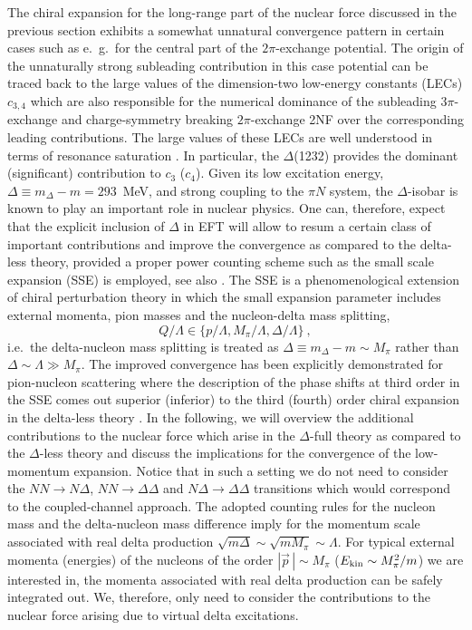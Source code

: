 \documentclass[aps,rmp,nofootinbib,twocolumn,floatfix]{revtex4}
\newcommand{\beq}{\begin{equation}}
\newcommand{\eeq}{\end{equation}}
\begin{document}
The chiral expansion for the long-range part of the nuclear force discussed in
the previous section exhibits a somewhat unnatural convergence pattern in
certain cases such as e.~g.~for the central part of the $2\pi$-exchange
potential.  The origin of the 
unnaturally strong subleading contribution in this case potential can be
traced back to the large values of the dimension-two low-energy
constants (LECs) $c_{3,4}$ which are also responsible
for the numerical dominance of the subleading $3\pi$-exchange 
\cite{Kaiser:2001dm} and charge-symmetry breaking $2\pi$-exchange 2NF
\cite{Epelbaum:2005fd} over the corresponding leading contributions. 
The large values of these LECs are well understood in
terms of resonance saturation \cite{Bernard:1996gq}. In particular, 
the $\Delta$(1232) provides the dominant (significant)
contribution to $c_3$ ($c_4$). Given its low excitation energy,
$\Delta  \equiv m_\Delta - m = 293$~MeV, and strong 
coupling to the $\pi N$ system, the $\Delta$-isobar is known 
to play an important role in nuclear physics. 
One can, therefore, expect that the explicit inclusion of $\Delta$
in EFT will allow to resum a certain class of important contributions and 
improve the convergence as compared to the delta-less theory, provided
a proper power counting scheme such as the small scale expansion (SSE) 
\cite{Hemmert:1997ye} is employed, see also \cite{Jenkins:1991bs}. The SSE is a phenomenological extension
of chiral perturbation theory in which the small expansion parameter
includes external momenta,  
pion masses and the nucleon-delta mass splitting,
\beq
Q/ \Lambda \in \{ p/\Lambda, M_\pi/ \Lambda, \Delta/\Lambda \}~,
\eeq
i.e.~the delta-nucleon mass splitting is treated as $\Delta \equiv m_\Delta -
m \sim M_\pi$ rather
than $\Delta \sim \Lambda \gg M_\pi$. The improved convergence has been
explicitly demonstrated for pion-nucleon scattering where the description of the 
phase shifts at third order in the SSE comes out superior (inferior) to the
third (fourth) order chiral expansion in the delta-less theory
 \cite{Fettes:2000bb}. In the following, we will overview the additional
 contributions to the nuclear force which arise in the $\Delta$-full theory
as compared to the $\Delta$-less theory and discuss the implications for the
convergence of the low-momentum expansion.  Notice that in such a setting we
do not need to consider the $NN \to N\Delta$, $NN \to \Delta \Delta$ and
$N\Delta  \to \Delta \Delta$ transitions  which
would correspond to the coupled-channel approach. The adopted counting rules for the
nucleon mass and the delta-nucleon mass difference imply for the momentum
scale associated with real delta production $\sqrt{m \Delta} \sim \sqrt{m
  M_\pi} \sim \Lambda$. For typical external momenta (energies) of the
nucleons of the order $| \vec p \, | \sim M_\pi$ ($E_{\rm kin}  \sim
M_\pi^2/m$) we are interested in, the momenta associated  with real delta
production can be safely integrated out. We, therefore, only need to consider
the contributions to the nuclear force arising due to
virtual delta excitations.
\end{document}
